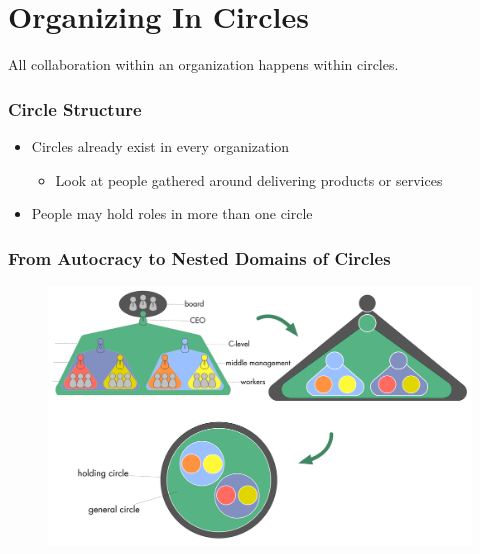 \section{Organizing In Circles}
\label{organizingincircles}

All collaboration within an organization happens within circles.

\subsubsection{Circle Structure}
\label{circlestructure}

\begin{itemize}
\item Circles already exist in every organization

\begin{itemize}
\item Look at people gathered around delivering products or services

\end{itemize}

\item People may hold roles in more than one circle

\end{itemize}

\subsubsection{From Autocracy to Nested Domains of Circles}
\label{fromautocracytonesteddomainsofcircles}

\begin{figure}[htbp]
\centering
\includegraphics[keepaspectratio,width=\textwidth,height=0.75\textheight]{img/structure/hierarchy-domains.png}
\end{figure}

